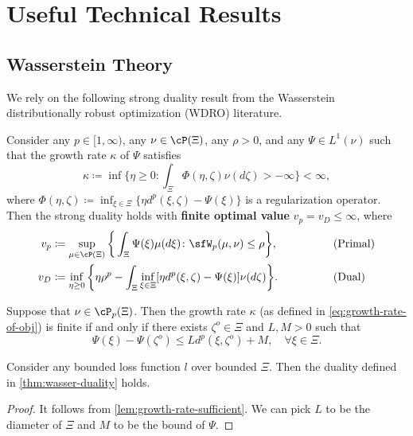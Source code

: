 \newpage
\appendix
\section{Useful Technical Results}
\subsection{Wasserstein Theory}\label{sec:wasserstein-theory}
We rely on the following strong duality result from the Wasserstein distributionally robust optimization (WDRO) literature.
\begin{lemma}\label{thm:wasser-duality}
    Consider any $p\in[1,\infty)$, any $\nu\in\cP(\Xi)$, any $\rho > 0$, and any $\Psi \in L^1(\nu)$ such that the growth rate $\kappa$ of $\Psi$ satisfies
    \begin{equation}\label{eq:growth-rate-of-obj}
        \kappa \coloneqq \inf\bigg\{ \eta \geq 0 \colon \int_\Xi \Phi(\eta, \zeta) \nu(d\zeta) > -\infty \bigg\} < \infty,
    \end{equation}
    where $\Phi(\eta,\zeta)\coloneqq \inf_{\xi\in\Xi}\{\eta d^p(\xi,\zeta)-\Psi(\xi)\}$ is a regularization operator. Then the strong duality holds with \textbf{finite optimal value} $v_p = v_D \leq \infty$, where
    \begin{align*}
        v_p &\coloneqq \sup_{\mu\in\cP(\Xi)} \bigg\{ \int_\Xi \Psi(\xi) \mu(d\xi) \colon \sfW_p(\mu,\nu)\leq \rho    \bigg\}, &&\qquad\qquad \text{(Primal)} \\
        v_D &\coloneqq \inf_{\eta \geq 0} \bigg\{  \eta \rho^p - \int_\Xi \inf_{\xi\in\Xi} [\eta d^p(\xi,\zeta) - \Psi(\xi)] \nu(d\zeta) \bigg\}. &&\qquad\qquad \text{(Dual)}
    \end{align*}
\end{lemma}

\begin{lemma}\label{lem:growth-rate-sufficient}
    Suppose that $\nu\in\cP_p(\Xi)$. Then the growth rate $\kappa$ (as defined in \cref{eq:growth-rate-of-obj}) is finite if and only if there exists $\zeta^o\in\Xi$ and $L,M>0$ such that
    \begin{equation}\label{eq:growth-rate-bounded-iff-condition}
    \Psi(\xi)-\Psi(\zeta^o) \leq Ld^p(\xi,\zeta^o) + M, \quad\forall \xi\in\Xi.
    \end{equation}
\end{lemma}
\begin{corollary}\label{cor:strong-duality-holds-for-dpo-loss}
    Consider any bounded loss function $l$ over bounded $\Xi$. Then the duality defined in \cref{thm:wasser-duality} holds.
\end{corollary}
\begin{proof}
    It follows from \cref{lem:growth-rate-sufficient}. We can pick $L$ to be the diameter of $\Xi$ and $M$ to be the bound of $\Psi$.
\end{proof}

